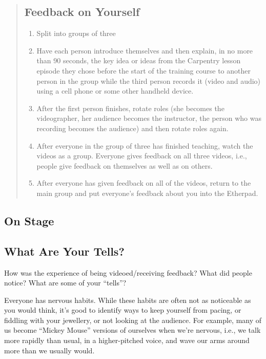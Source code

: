 \begin{quotation}   %
\subsection*{Feedback on Yourself}

\begin{enumerate}
\item Split into groups of three
\item Have each person introduce themselves
and then explain, in no more than 90 seconds,
the key idea or ideas from
the Carpentry lesson episode they chose before the start of the training course
to another person in the group
while the third person records it (video and audio)
using a cell phone or some other handheld device.
\item After the first person finishes,
rotate roles
(she becomes the videographer,
her audience becomes the instructor,
the person who was recording becomes the audience)
and then rotate roles again.
\item After everyone in the group of three has finished teaching,
watch the videos as a group.
Everyone gives feedback on all three videos,
i.e., people give feedback on themselves as well as on others.
\item After everyone has given feedback on all of the videos,
return to the main group and put everyone's feedback about you into the Etherpad.
\end{enumerate}
\end{quotation}   %

\subsection*{On Stage}

\subsection*{What Are Your Tells?}

How was the experience of being videoed/receiving feedback?  What
did people notice?  What are some of your ``tells''?


Everyone has nervous habits.  While these habits are often not as noticeable
as you would think, it's good to identify ways to keep yourself from pacing,
or fiddling with your jewellery, or not looking at the audience.
For example, many of us become ``Mickey Mouse'' versions of ourselves when we're nervous,
i.e., we talk more rapidly than usual, in a higher-pitched voice,
and wave our arms around more than we usually would.

